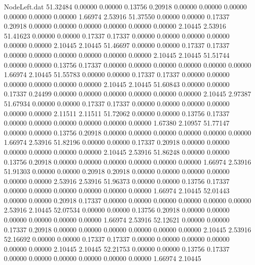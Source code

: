 \begin{filecontents}{NodeLeft.dat}
  51.32484    0.00000    0.00000     0.13756    0.20918    0.00000    0.00000    0.00000    0.00000    0.00000    0.00000    1.66974    2.53916
  51.37550    0.00000    0.00000     0.17337    0.20918    0.00000    0.00000    0.00000    0.00000    0.00000    0.00000    2.10445    2.53916
  51.41623    0.00000    0.00000     0.17337    0.17337    0.00000    0.00000    0.00000    0.00000    0.00000    0.00000    2.10445    2.10445
  51.46697    0.00000    0.00000     0.17337    0.17337    0.00000    0.00000    0.00000    0.00000    0.00000    0.00000    2.10445    2.10445
  51.51744    0.00000    0.00000     0.13756    0.17337    0.00000    0.00000    0.00000    0.00000    0.00000    0.00000    1.66974    2.10445
  51.55783    0.00000    0.00000     0.17337    0.17337    0.00000    0.00000    0.00000    0.00000    0.00000    0.00000    2.10445    2.10445
  51.60843    0.00000    0.00000     0.17337    0.24499    0.00000    0.00000    0.00000    0.00000    0.00000    0.00000    2.10445    2.97387
  51.67934    0.00000    0.00000     0.17337    0.17337    0.00000    0.00000    0.00000    0.00000    0.00000    0.00000    2.11511    2.11511
  51.72062    0.00000    0.00000     0.13756    0.17337    0.00000    0.00000    0.00000    0.00000    0.00000    0.00000    1.67380    2.10957
  51.77147    0.00000    0.00000     0.13756    0.20918    0.00000    0.00000    0.00000    0.00000    0.00000    0.00000    1.66974    2.53916
  51.82196    0.00000    0.00000     0.17337    0.20918    0.00000    0.00000    0.00000    0.00000    0.00000    0.00000    2.10445    2.53916
  51.86248    0.00000    0.00000     0.13756    0.20918    0.00000    0.00000    0.00000    0.00000    0.00000    0.00000    1.66974    2.53916
  51.91303    0.00000    0.00000     0.20918    0.20918    0.00000    0.00000    0.00000    0.00000    0.00000    0.00000    2.53916    2.53916
  51.96373    0.00000    0.00000     0.13756    0.17337    0.00000    0.00000    0.00000    0.00000    0.00000    0.00000    1.66974    2.10445
  52.01443    0.00000    0.00000     0.20918    0.17337    0.00000    0.00000    0.00000    0.00000    0.00000    0.00000    2.53916    2.10445
  52.07534    0.00000    0.00000     0.13756    0.20918    0.00000    0.00000    0.00000    0.00000    0.00000    0.00000    1.66974    2.53916
  52.12621    0.00000    0.00000     0.17337    0.20918    0.00000    0.00000    0.00000    0.00000    0.00000    0.00000    2.10445    2.53916
  52.16692    0.00000    0.00000     0.17337    0.17337    0.00000    0.00000    0.00000    0.00000    0.00000    0.00000    2.10445    2.10445
  52.21753    0.00000    0.00000     0.13756    0.17337    0.00000    0.00000    0.00000    0.00000    0.00000    0.00000    1.66974    2.10445

\end{filecontents}
